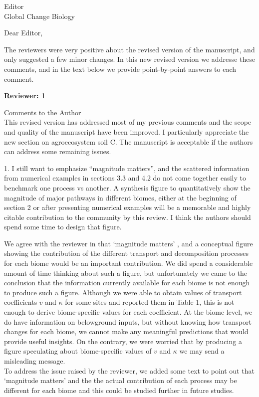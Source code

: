 \documentclass[11pt]{bgcletter}
\newcommand{\answer}[1] {
{\color{cyan} #1}
}
\begin{document}
\begin{letter}{Editor\\
   Global Change Biology
}
\opening{Dear Editor,}
The reviewers were very positive about the revised version of the manuscript, and only suggested a few minor changes. 
In this new revised version we addresse these comments, and in the text below we provide point-by-point \answer{answers} to each comment. 


\textbf{Reviewer: 1}

Comments to the Author \\
This revised version has addressed most of my previous comments and the scope and quality of the manuscript have been improved. I particularly appreciate the new section on agroecosystem soil C. The manuscript is acceptable if the authors can address some remaining issues.

1. I still want to emphasize ``magnitude matters'', and the scattered information from numerical examples in sections 3.3 and 4.2 do not come together easily to benchmark one process vs another. A synthesis figure to quantitatively show the magnitude of major pathways in different biomes, either at the beginning of section 2 or after presenting numerical examples will be a memorable and highly citable contribution to the community by this review. I think the authors should spend some time to design that figure.

\answer{We agree with the reviewer in that `magnitude matters' , and a conceptual figure showing the contribution of the different transport and decomposition processes for each biome would be an important contribution. We did spend a considerable amount of time thinking about such a figure, but unfortunately we came to the conclusion that the information currently available for each biome is not enough to produce such a figure. Although we were able to obtain values of transport coefficients $v$ and $\kappa$ for some sites and reported them in Table 1, this is not enough to derive biome-specific values for each coefficient. At the biome level, we do have information on belowground inputs, but without knowing how transport changes for each biome, we cannot make any meaningful predictions that would provide useful insights. On the contrary, we were worried that by producing a figure speculating about biome-specific values of $v$ and $\kappa$ we may send a misleading message. \\ To address the issue raised by the reviewer, we added some text to point out that `magnitude matters' and the the actual contribution of each process may be different for each biome and this could be studied further in future studies. }


\end{letter}
\end{document}
